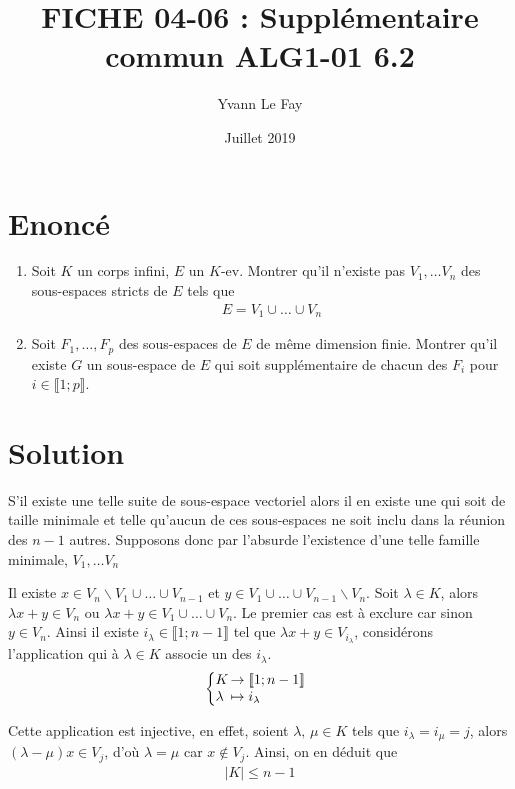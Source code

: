 \documentclass{article}
\begin{document}
\title{FICHE 04-06 : Supplémentaire commun ALG1-01 6.2}
\author{Yvann Le Fay}
\date{Juillet 2019}
\maketitle
\section*{Enoncé}
\begin{enumerate}
	\item Soit $K$ un corps infini, $E$ un $K$-ev. Montrer qu'il n'existe pas $V_1,\ldots V_n$ des sous-espaces stricts de $E$ tels que
\begin{align*}
	E = V_1 \cup \ldots \cup V_n
\end{align*}
\item Soit $F_1,\ldots, F_p$ des sous-espaces de $E$ de même dimension finie. Montrer qu'il existe $G$ un sous-espace de $E$ qui soit supplémentaire de chacun des $F_i$ pour $i\in\llbracket 1;p\rrbracket$.
\end{enumerate}
\section*{Solution}
S'il existe une telle suite de sous-espace vectoriel alors il en existe une qui soit de taille minimale et telle qu'aucun de ces sous-espaces ne soit inclu dans la réunion des $n-1$ autres. Supposons donc par l'absurde l'existence d'une telle famille minimale, $V_1, \ldots V_n$

Il existe $x \in V_n\backslash V_1\cup\ldots\cup V_{n-1}$ et $y\in V_1\cup \ldots \cup V_{n-1}\backslash V_n$. Soit $\lambda\in K$, alors $\lambda x + y\in V_n$ ou $\lambda x +y\in V_1\cup\ldots \cup V_n$. Le premier cas est à exclure car sinon $y\in V_n$. Ainsi il existe  $i_{\lambda}\in\llbracket 1;n-1\rrbracket$ tel que $\lambda x + y \in V_{i_{\lambda}}$, considérons l'application qui à $\lambda\in K$ associe un des $i_{\lambda}$. 
\begin{align*}
	\left\{
		\begin{array}{@{}l@{\thinspace}l}
			K &\to \llbracket 1;n-1\rrbracket\\
			\lambda &\mapsto i_{\lambda}
		\end{array}
	\right.
\end{align*}

Cette application est injective, en effet, soient $\lambda,\,\mu\in K$ tels que $i_{\lambda}=i_{\mu} = j$, alors $(\lambda-\mu)x\in V_{j}$, d'où $\lambda = \mu$ car $x\notin V_j$. Ainsi, on en déduit que 
\begin{align*}
	|K|\leq n-1
\end{align*}
\end{document}
